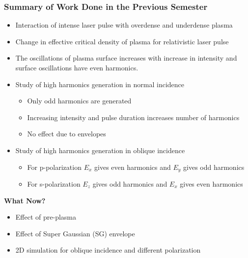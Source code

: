 \documentclass{beamer}
\begin{document}
\begin{frame}
    \frametitle{Summary of Work Done in the Previous Semester}
    \small
    \begin{itemize}
        \item Interaction of intense laser pulse with overdense and underdense plasma
        \item Change in effective critical density of plasma for relativistic laser pulse
        \item The oscillations of plasma surface increases with increase in intensity and surface oscillations have even harmonics.
        \item Study of high harmonics generation in normal incidence
              \begin{itemize}
                  \item Only odd harmonics are generated
                  \item Increasing intensity and pulse duration increases number of harmonics
                  \item No effect due to envelopes
              \end{itemize}
        \item Study of high harmonics generation in oblique incidence
              \begin{itemize}
                  \item For p-polarization $E_x$ gives even harmonics and $E_y$ gives odd harmonics
                  \item For s-polarization $E_z$ gives odd harmonics and $E_x$ gives even harmonics
              \end{itemize}
    \end{itemize}

    \textbf{What Now?}
    \begin{itemize}
        \item Effect of pre-plasma
        \item Effect of Super Gaussian (SG) envelope
        \item 2D simulation for oblique incidence and different polarization
    \end{itemize}
\end{frame}
\end{document}
